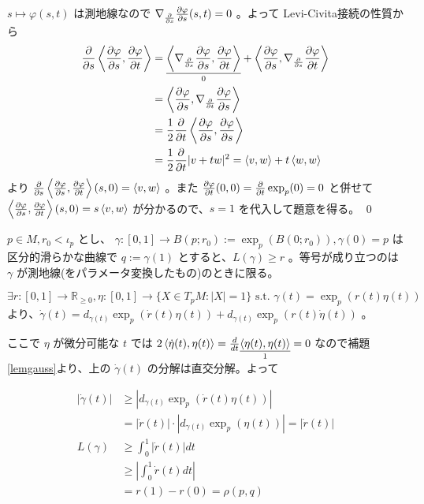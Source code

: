 \documentclass[dvipdfmx,a4paper]{jsreport}
\theoremstyle{definition}
\newcommand{\der}{\partial}
\renewcommand{\phi}{\varphi}
\begin{document}
$s \mapsto \phi(s,t)$ は測地線なので $\nabla_{\der \over \der s}{\der \phi \over \der s}(s,t)=0$ 。よって Levi-Civita接続の性質から
\begin{align*}
    {\der \over \der s} \ev{{\der \phi \over \der s},{\der \phi \over \der t}} &= \underset{0}{\underline{\ev{\nabla_{{\der \over \der s}}{\der \phi \over \der s},{\der \phi \over \der t}}}}+\ev{{\der \phi \over \der s},\nabla_{{\der \over \der s}}{\der \phi \over \der t}} \\
    &= \ev{{\der \phi \over \der s},\nabla_{{\der \over \der t}}{\der \phi \over \der s}} \\
    &= {1 \over 2}{\der \over \der t}\ev{{\der \phi \over \der s},{\der \phi \over \der s}} \\
    &= {1 \over 2}{\der \over \der t}|v+tw|^2 = \ev{v,w}+t\ev{w,w}
\end{align*}
より ${\der \over \der s} \ev{{\der \phi \over \der s},{\der \phi \over \der t}}(s,0)=\ev{v,w}$ 。また ${\der \phi \over \der t}(0,0)={\der \over \der t}\exp_p(0)=0$ と併せて $\ev{{\der \phi \over \der s},{\der \phi \over \der t}}(s,0)=s\ev{v,w}$ が分かるので、$s=1$ を代入して題意を得る。 \qed


\prop\label{propmin} $p \in M,r_0 <\iota_p$ とし、 $\gamma:[0,1] \to B(p;r_0):=\exp_p(B(0;r_0)),\gamma(0)=p$ は区分的滑らかな曲線で $q:=\gamma(1)$ とすると、$L(\gamma) \geq r$ 。等号が成り立つのは $\gamma$ が測地線(をパラメータ変換したもの)のときに限る。

\prf $\exists r:[0,1] \to \mathbb{R}_{\geq 0},\eta:[0,1] \to \{X \in T_pM \colon |X|=1\}\mbox{ s.t. }\gamma(t)=\exp_p(r(t)\eta(t))$ より、$\dot{\gamma}(t)=d_{\gamma(t)}\exp_p(\dot{r}(t)\eta(t))+d_{\gamma(t)}\exp_p(r(t)\dot{\eta}(t))$ 。

ここで $\eta$ が微分可能な $t$ では $2\ev{\dot{\eta}(t),\eta(t)}={d \over dt}\underset{1}{\underline{\ev{\eta(t),\eta(t)}}}=0$ なので補題\ref{lemgauss}より、上の $\dot{\gamma}(t)$ の分解は直交分解。よって

\begin{align*}
    |\dot{\gamma}(t)| &\geq |d_{\gamma(t)}\exp_p(\dot{r}(t)\eta(t))| \\
    &=|\dot{r}(t)| \cdot |d_{\gamma(t)}\exp_p(\eta(t))| =|\dot{r}(t)| \\
    L(\gamma) &\geq \int_{0}^1 |\dot{r}(t)| dt \\
    &\geq |\int_{0}^1 \dot{r}(t) dt| \\
    &= r(1)-r(0)=\rho(p,q)
\end{align*}
\end{document}
